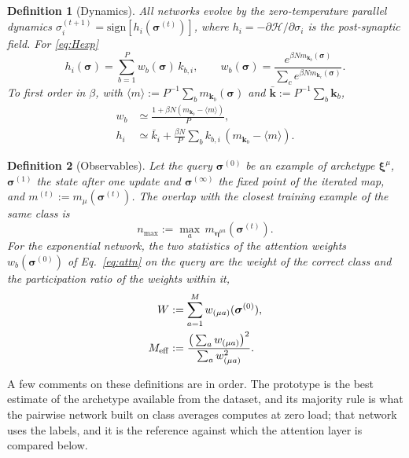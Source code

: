 \documentclass[11pt,a4paper]{article}
\newtheorem{definition}{Definition}
\newcommand{\s}{\bm{\sigma}}
\newcommand{\x}{\bm{\xi}}
\newcommand{\e}{\bm{\eta}}
\newcommand{\Meff}{M_{\rm eff}}
\newcommand{\sgn}{\mathrm{sign}}
\begin{document}
\begin{definition}[Dynamics]\label{def:dyn}
All networks evolve by the zero-temperature parallel dynamics $\sigma_i^{(t+1)}=\sgn[h_i(\s^{(t)})]$, where $h_i=-\partial\mathcal H/\partial\sigma_i$ is the post-synaptic field. For \eqref{eq:Hexp}
\begin{equation}
h_i(\s)=\sum_{b=1}^P w_b(\s)\,k_{b,i},\qquad w_b(\s)=\frac{e^{\beta N m_{\bm k_b}(\s)}}{\sum_{c}e^{\beta N m_{\bm k_c}(\s)}}.
\label{eq:attn}
\end{equation}
To first order in $\beta$, with $\langle m\rangle:=P^{-1}\sum_bm_{\bm k_b}(\s)$ and $\bar{\bm k}:=P^{-1}\sum_b\bm k_b$,
\begin{align}
w_b&\simeq\frac{1+\beta N(m_{\bm k_b}-\langle m\rangle)}{P},\nonumber\\
h_i&\simeq\bar k_i+\frac{\beta N}{P}\sum_b k_{b,i}\,(m_{\bm k_b}-\langle m\rangle).\label{eq:smallbeta}
\end{align}
\end{definition}

\begin{definition}[Observables]\label{def:obs}
Let the query $\s^{(0)}$ be an example of archetype $\x^\mu$, $\s^{(1)}$ the state after one update and $\s^{(\infty)}$ the fixed point of the iterated map, and $m^{(t)}:=m_\mu(\s^{(t)})$. The overlap with the closest training example of the same class is
\begin{equation}
n_{\max}:=\max_{a}\,m_{\e^{\mu a}}(\s^{(t)}).
\end{equation}
For the exponential network, the two statistics of the attention weights $w_b(\s^{(0)})$ of Eq.\ \eqref{eq:attn} on the query are the weight of the correct class and the participation ratio of the weights within it,
\begin{align}
W&:=\sum_{a=1}^M w_{(\mu a)}(\s^{(0)}),\label{eq:Wdef}\\
\Meff&:=\frac{\big(\sum_a w_{(\mu a)}\big)^2}{\sum_a w_{(\mu a)}^2}.\label{eq:Meffdef}
\end{align}
\end{definition}

A few comments on these definitions are in order. The prototype is the best estimate of the archetype available from the dataset, and its majority rule is what the pairwise network built on class averages computes at zero load; that network uses the labels, and it is the reference against which the attention layer is compared below.
\end{document}
